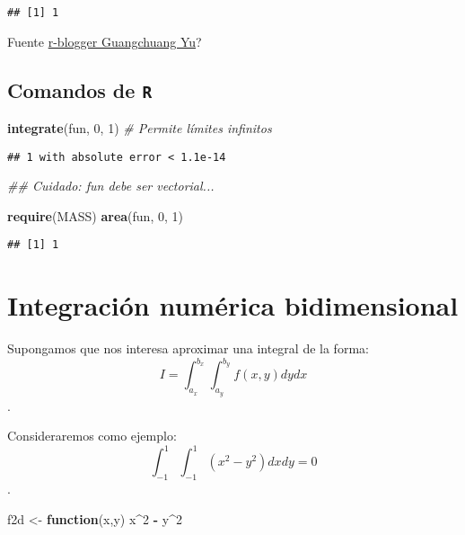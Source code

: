 \documentclass[
]{book}
\newenvironment{Shaded}{\begin{snugshade}}{\end{snugshade}}
\newcommand{\CommentTok}[1]{\textcolor[rgb]{0.56,0.35,0.01}{\textit{#1}}}
\newcommand{\ControlFlowTok}[1]{\textcolor[rgb]{0.13,0.29,0.53}{\textbf{#1}}}
\newcommand{\DecValTok}[1]{\textcolor[rgb]{0.00,0.00,0.81}{#1}}
\newcommand{\KeywordTok}[1]{\textcolor[rgb]{0.13,0.29,0.53}{\textbf{#1}}}
\newcommand{\NormalTok}[1]{#1}
\newcommand{\OperatorTok}[1]{\textcolor[rgb]{0.81,0.36,0.00}{\textbf{#1}}}
\newcommand{\StringTok}[1]{\textcolor[rgb]{0.31,0.60,0.02}{#1}}
\theoremstyle{break}
\theoremstyle{definition}
\theoremstyle{definition}
\theoremstyle{definition}
\theoremstyle{remark}
\begin{document}
\begin{verbatim}
## [1] 1
\end{verbatim}

Fuente \href{https://www.r-bloggers.com/one-dimensional-integrals}{r-blogger Guangchuang Yu}?

\hypertarget{comandos-de-r}{%
\subsection{\texorpdfstring{Comandos de \texttt{R}}{Comandos de R}}\label{comandos-de-r}}

\begin{Shaded}
\begin{Highlighting}[]
\KeywordTok{integrate}\NormalTok{(fun, }\DecValTok{0}\NormalTok{, }\DecValTok{1}\NormalTok{)   }\CommentTok{# Permite límites infinitos  }
\end{Highlighting}
\end{Shaded}

\begin{verbatim}
## 1 with absolute error < 1.1e-14
\end{verbatim}

\begin{Shaded}
\begin{Highlighting}[]
\CommentTok{## Cuidado: fun debe ser vectorial...}

\KeywordTok{require}\NormalTok{(MASS)}
\KeywordTok{area}\NormalTok{(fun, }\DecValTok{0}\NormalTok{, }\DecValTok{1}\NormalTok{)}
\end{Highlighting}
\end{Shaded}

\begin{verbatim}
## [1] 1
\end{verbatim}

\hypertarget{integraciuxf3n-numuxe9rica-bidimensional}{%
\section{Integración numérica bidimensional}\label{integraciuxf3n-numuxe9rica-bidimensional}}

Supongamos que nos interesa aproximar una integral de la forma:
\[I=\int_{a_x}^{b_x}\int_{a_y}^{b_y}f(x, y)dy dx\].

Consideraremos como ejemplo:
\[\int_{-1}^{1} \int_{-1}^{1} \left( x^2 - y^2 \right) dx dy = 0\].

\begin{Shaded}
\begin{Highlighting}[]
\NormalTok{f2d <-}\StringTok{ }\ControlFlowTok{function}\NormalTok{(x,y) x}\OperatorTok{^}\DecValTok{2} \OperatorTok{-}\StringTok{ }\NormalTok{y}\OperatorTok{^}\DecValTok{2}
\end{Highlighting}
\end{Shaded}
\end{document}
